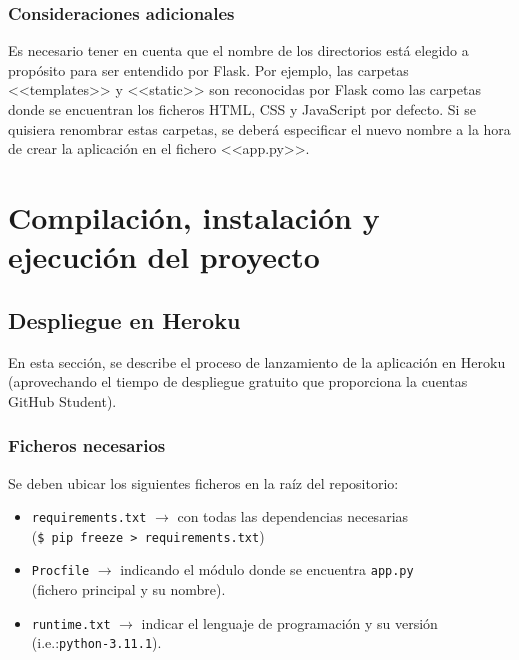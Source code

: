 \subsubsection{Consideraciones adicionales}
Es necesario tener en cuenta que el nombre de los directorios está elegido a propósito para ser entendido por Flask. Por ejemplo, las carpetas <<templates>> y <<static>> son reconocidas por Flask como las carpetas donde se encuentran los ficheros HTML, CSS y JavaScript por defecto. Si se quisiera renombrar estas carpetas, se deberá especificar el nuevo nombre a la hora de crear la aplicación en el fichero <<app.py>>.

\section{Compilación, instalación y ejecución del proyecto}

\subsection{Despliegue en Heroku}
En esta sección, se describe el proceso de lanzamiento de la aplicación en Heroku (aprovechando el tiempo de despliegue gratuito que proporciona la cuentas GitHub Student).


\subsubsection{Ficheros necesarios}
Se deben ubicar los siguientes ficheros en la raíz del repositorio:
\begin{itemize}
    \item \texttt{requirements.txt} $\to$ con todas las dependencias necesarias \\
    (\texttt{\$ pip freeze > requirements.txt})
    \item \texttt{Procfile} $\to$ indicando el módulo donde se encuentra \texttt{app.py} \\
    (fichero principal y su nombre).
    \item \texttt{runtime.txt} $\to$ indicar el lenguaje de programación y su versión (i.e.:\texttt{python-3.11.1}).
\end{itemize}

